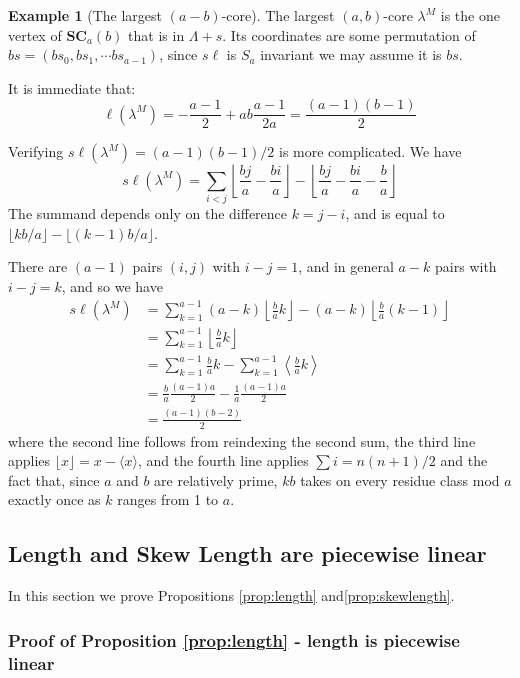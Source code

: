 \documentclass{amsart}[12pt]
\theoremstyle{definition}
\newtheorem{example}[dummy]{Example}
\newcommand{\SC}{\mathbf{SC}}
\newcommand{\sk}{s\ell}
\begin{document}
\begin{example}[The largest $(a-b)$-core]

The largest $(a,b)$-core $\lambda^M$ is the one vertex of $\SC_a(b)$ that is in $\Lambda+s$.  Its coordinates are some permutation of
$bs=(bs_0,bs_1,\cdots bs_{a-1})$, since $\sk$ is $S_a$ invariant we may assume it is $bs$.  

It is immediate that:
$$\ell(\lambda^M)=-\frac{a-1}{2}+ab\frac{a-1}{2a}=\frac{(a-1)(b-1)}{2}$$

Verifying $\sk(\lambda^M)=(a-1)(b-1)/2$ is more complicated.  We have 
$$\sk(\lambda^M)=\sum_{i<j} \left\lfloor \frac{bj}{a}-\frac{bi}{a}\right\rfloor
-\left\lfloor \frac{bj}{a}-\frac{bi}{a}-\frac{b}{a}\right\rfloor$$
The summand depends only on the difference $k=j-i$, and is equal to $\lfloor kb/a\rfloor-\lfloor(k-1)b/a\rfloor$.

There are $(a-1)$ pairs $(i,j)$ with $i-j=1$, and in general $a-k$ pairs with $i-j=k$, and so we have
\begin{align*}
\sk(\lambda^M) &=\sum_{k=1}^{a-1}(a-k)\left\lfloor \frac{b}{a} k\right\rfloor-(a-k)\left\lfloor\frac{b}{a}(k-1)\right\rfloor \\
&=\sum_{k=1}^{a-1} \left\lfloor \frac{b}{a} k\right\rfloor \\
&=\sum_{k=1}^{a-1} \frac{b}{a}k-\sum_{k=1}^{a-1}\left\langle \frac{b}{a}k\right\rangle \\
&=\frac{b}{a} \frac{(a-1)a}{2}-\frac{1}{a}\frac{(a-1)a}{2} \\
&=\frac{(a-1)(b-2)}{2}
\end{align*}
where the second line follows from reindexing the second sum, the third line applies $\lfloor x\rfloor=x-\langle x\rangle$, and the fourth line applies $\sum i=n(n+1)/2$ and the fact that, since $a$ and $b$ are relatively prime, $kb$ takes on every residue class mod $a$ exactly once as $k$ ranges from 1 to $a$.

\end{example}


\subsection{Length and Skew Length are piecewise linear}
In this section we prove Propositions \ref{prop:length} and\ref{prop:skewlength}.

\subsubsection{Proof of Proposition \ref{prop:length} - length is piecewise linear} 
\end{document}

